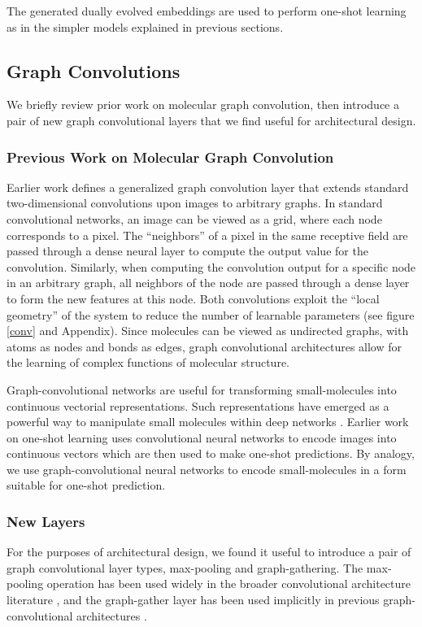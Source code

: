 \documentclass[journal=jacsat,manuscript=article]{achemso}
\begin{document}
The generated dually evolved embeddings are used to perform one-shot learning as in the simpler models explained in previous sections.

\subsection{Graph Convolutions}
We briefly review prior work on molecular graph convolution, then introduce a pair of new graph convolutional layers that we find useful for architectural design.

\subsubsection{Previous Work on Molecular Graph Convolution}
Earlier work \cite{duvenaud2015convolutional} defines a generalized graph convolution layer that extends standard two-dimensional convolutions upon images to arbitrary graphs. In standard convolutional networks, an image can be viewed as a grid, where each node corresponds to a pixel. The ``neighbors'' of a pixel in the same receptive field are passed through a dense neural layer to compute the output value for the convolution\cite{karpathy231n}. Similarly, when computing the convolution output for a specific node in an arbitrary graph, all neighbors of the node are passed through a dense layer to form the new features at this node. Both convolutions exploit the ``local geometry'' of the system to reduce the number of learnable parameters (see figure \ref{conv} and Appendix). Since molecules can be viewed as undirected graphs, with atoms as nodes and bonds as edges, graph convolutional architectures allow for the learning of complex functions of molecular structure.

Graph-convolutional networks are useful for transforming small-molecules into continuous vectorial representations. Such representations have emerged as a powerful way to manipulate small molecules within deep networks \cite{gomez2016automatic}. Earlier work on one-shot learning uses convolutional neural networks to encode images into continuous vectors which are then used to make one-shot predictions. By analogy, we use graph-convolutional neural networks to encode small-molecules in a form suitable for one-shot prediction.


\subsubsection{New Layers}
For the purposes of architectural design, we found it useful to introduce a pair of graph convolutional layer types, max-pooling and graph-gathering. The max-pooling operation has been used widely in the broader convolutional architecture literature \cite{karpathy231n}, and the graph-gather layer has been used implicitly in previous graph-convolutional architectures \cite{duvenaud2015convolutional}.
\end{document}
